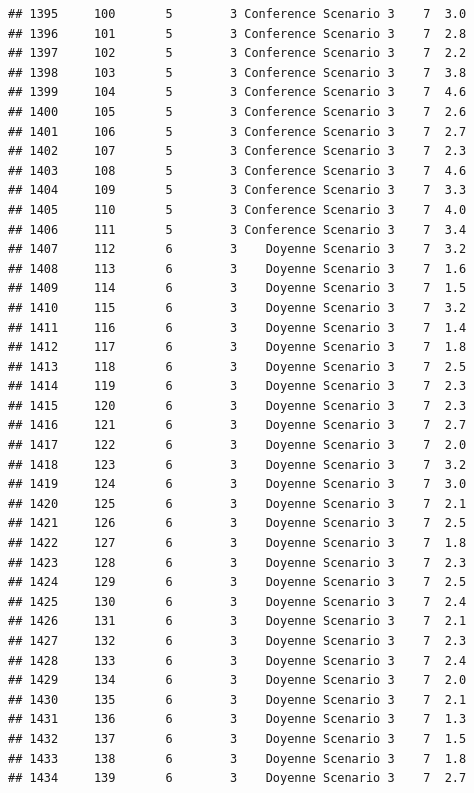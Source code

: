 \documentclass[
]{article}
\begin{document}
\begin{verbatim}
## 1395     100       5        3 Conference Scenario 3    7  3.0
## 1396     101       5        3 Conference Scenario 3    7  2.8
## 1397     102       5        3 Conference Scenario 3    7  2.2
## 1398     103       5        3 Conference Scenario 3    7  3.8
## 1399     104       5        3 Conference Scenario 3    7  4.6
## 1400     105       5        3 Conference Scenario 3    7  2.6
## 1401     106       5        3 Conference Scenario 3    7  2.7
## 1402     107       5        3 Conference Scenario 3    7  2.3
## 1403     108       5        3 Conference Scenario 3    7  4.6
## 1404     109       5        3 Conference Scenario 3    7  3.3
## 1405     110       5        3 Conference Scenario 3    7  4.0
## 1406     111       5        3 Conference Scenario 3    7  3.4
## 1407     112       6        3    Doyenne Scenario 3    7  3.2
## 1408     113       6        3    Doyenne Scenario 3    7  1.6
## 1409     114       6        3    Doyenne Scenario 3    7  1.5
## 1410     115       6        3    Doyenne Scenario 3    7  3.2
## 1411     116       6        3    Doyenne Scenario 3    7  1.4
## 1412     117       6        3    Doyenne Scenario 3    7  1.8
## 1413     118       6        3    Doyenne Scenario 3    7  2.5
## 1414     119       6        3    Doyenne Scenario 3    7  2.3
## 1415     120       6        3    Doyenne Scenario 3    7  2.3
## 1416     121       6        3    Doyenne Scenario 3    7  2.7
## 1417     122       6        3    Doyenne Scenario 3    7  2.0
## 1418     123       6        3    Doyenne Scenario 3    7  3.2
## 1419     124       6        3    Doyenne Scenario 3    7  3.0
## 1420     125       6        3    Doyenne Scenario 3    7  2.1
## 1421     126       6        3    Doyenne Scenario 3    7  2.5
## 1422     127       6        3    Doyenne Scenario 3    7  1.8
## 1423     128       6        3    Doyenne Scenario 3    7  2.3
## 1424     129       6        3    Doyenne Scenario 3    7  2.5
## 1425     130       6        3    Doyenne Scenario 3    7  2.4
## 1426     131       6        3    Doyenne Scenario 3    7  2.1
## 1427     132       6        3    Doyenne Scenario 3    7  2.3
## 1428     133       6        3    Doyenne Scenario 3    7  2.4
## 1429     134       6        3    Doyenne Scenario 3    7  2.0
## 1430     135       6        3    Doyenne Scenario 3    7  2.1
## 1431     136       6        3    Doyenne Scenario 3    7  1.3
## 1432     137       6        3    Doyenne Scenario 3    7  1.5
## 1433     138       6        3    Doyenne Scenario 3    7  1.8
## 1434     139       6        3    Doyenne Scenario 3    7  2.7

\end{verbatim}
\end{document}
